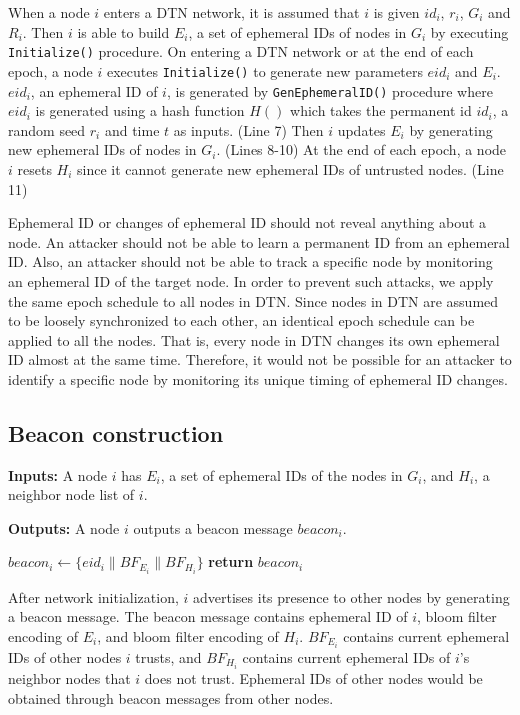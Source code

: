 \documentclass[11pt]{article}
\begin{document}
When a node $i$ enters a DTN network, it is assumed that $i$ is given $id_i$, $r_i$, $G_i$ and  $R_i$.  
Then $i$ is able to build $E_i$, a set of ephemeral IDs of nodes in $G_i$ by executing \texttt{Initialize()} procedure.  
On entering a DTN network or at the end of each epoch, a node $i$ executes \texttt{Initialize()} to generate new parameters $eid_i$ and $E_i$.  
$eid_i$, an ephemeral ID of $i$, is generated by \texttt{GenEphemeralID()} procedure where $eid_i$ is generated using a hash function $H()$ which takes the permanent id $id_i$, a random seed $r_i$ and time $t$ as inputs. (Line 7)  
Then $i$ updates $E_i$ by generating new ephemeral IDs of nodes in $G_i$. (Lines 8-10)  
At the end of each epoch, a node $i$ resets $H_i$ since it cannot generate new ephemeral IDs of untrusted nodes. (Line 11)

Ephemeral ID or changes of ephemeral ID should not reveal anything about a node.
An attacker should not be able to learn a permanent ID from an ephemeral ID.  
Also, an attacker should not be able to track a specific node by monitoring an ephemeral ID of the target node. 
In order to prevent such attacks, we apply the same epoch schedule to all nodes in DTN. 
Since nodes in DTN are assumed to be loosely synchronized to each other, an identical epoch schedule can be applied to all the nodes.  
That is, every node in DTN changes its own ephemeral ID almost at the same time.   
Therefore, it would not be possible for an attacker to identify a specific node by monitoring its unique timing of ephemeral ID changes.


\subsection{Beacon construction}
\begin{framed}
\noindent
\textbf{Inputs:} A node $i$ has $E_i$, a set of ephemeral IDs of the nodes in $G_i$, and $H_i$, a neighbor node list of $i$.

\noindent
\textbf{Outputs:} A node $i$ outputs a beacon message $beacon_i$.\\

\begin{algorithmic}[1]
    \State $beacon_i \leftarrow \{ eid_i \| BF_{E_i} \| BF_{H_i} \}$         
    \State \textbf{return} $beacon_i$
  \EndProcedure  
\end{algorithmic}
\end{framed}

After network initialization, $i$ advertises its presence to other nodes by generating a beacon message.  
The beacon message contains ephemeral ID of $i$, bloom filter encoding of $E_i$, and bloom filter encoding of $H_i$.  
$BF_{E_i}$ contains current ephemeral IDs of other nodes $i$ trusts, and $BF_{H_i}$ contains current ephemeral IDs of $i$'s neighbor nodes that $i$ does not trust.  
Ephemeral IDs of other nodes would be obtained through beacon messages from other nodes. 
\end{document}

